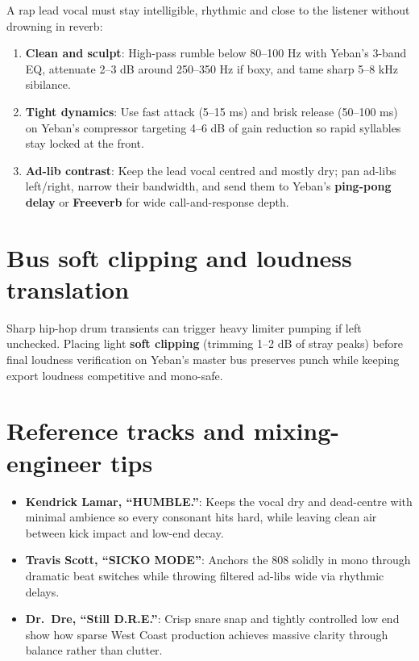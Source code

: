A rap lead vocal must stay intelligible, rhythmic and close to the listener without drowning in reverb:
\begin{enumerate}
  \item \textbf{Clean and sculpt}: High-pass rumble below 80--100 Hz with Yeban's 3-band EQ, attenuate 2--3 dB around 250--350 Hz if boxy, and tame sharp 5--8 kHz sibilance.
  \item \textbf{Tight dynamics}: Use fast attack (5--15 ms) and brisk release (50--100 ms) on Yeban's compressor targeting 4--6 dB of gain reduction so rapid syllables stay locked at the front.
  \item \textbf{Ad-lib contrast}: Keep the lead vocal centred and mostly dry; pan ad-libs left/right, narrow their bandwidth, and send them to Yeban's \textbf{ping-pong delay} or \textbf{Freeverb} for wide call-and-response depth.
\end{enumerate}

\section{Bus soft clipping and loudness translation}

Sharp hip-hop drum transients can trigger heavy limiter pumping if left unchecked. Placing light \textbf{soft clipping} (trimming 1--2 dB of stray peaks) before final loudness verification on Yeban's master bus preserves punch while keeping export loudness competitive and mono-safe.

\section{Reference tracks and mixing-engineer tips}

\begin{itemize}
  \item \textbf{Kendrick Lamar, ``HUMBLE.''}: Keeps the vocal dry and dead-centre with minimal ambience so every consonant hits hard, while leaving clean air between kick impact and low-end decay.
  \item \textbf{Travis Scott, ``SICKO MODE''}: Anchors the 808 solidly in mono through dramatic beat switches while throwing filtered ad-libs wide via rhythmic delays.
  \item \textbf{Dr.\ Dre, ``Still D.R.E.''}: Crisp snare snap and tightly controlled low end show how sparse West Coast production achieves massive clarity through balance rather than clutter.
\end{itemize}

